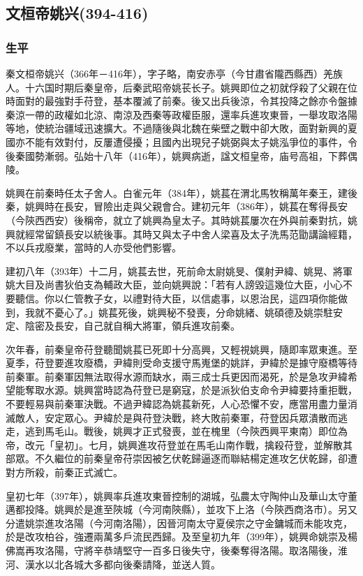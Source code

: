 
\subsection{文桓帝姚兴\tiny(394-416)}

\subsubsection{生平}

秦文桓帝姚兴（366年－416年），字子略，南安赤亭（今甘肅省隴西縣西）羌族人。十六国时期后秦皇帝，后秦武昭帝姚苌长子。姚興即位之初就俘殺了父親在位時面對的最強對手苻登，基本覆滅了前秦。後又出兵後涼，令其投降之餘亦令盤據秦涼一帶的政權如北涼、南涼及西秦等政權臣服，還率兵進攻東晉，一舉攻取洛陽等地，使統治疆域迅速擴大。不過隨後與北魏在柴壁之戰中卻大敗，面對新興的夏國亦不能有效對付，反屢遭侵擾；且國內出現兒子姚弼與太子姚泓爭位的事件，令後秦國勢漸弱。弘始十八年（416年），姚興病逝，諡文桓皇帝，庙号高祖，下葬偶陵。

姚興在前秦時任太子舍人。白雀元年（384年），姚萇在渭北馬牧稱萬年秦王，建後秦，姚興時在長安，冒險出走與父親會合。建初元年（386年），姚萇在奪得長安（今陝西西安）後稱帝，就立了姚興為皇太子。其時姚萇屢次在外與前秦對抗，姚興就經常留鎮長安以統後事。其時又與太子中舍人梁喜及太子洗馬范勖講論經籍，不以兵戎廢業，當時的人亦受他們影響。

建初八年（393年）十二月，姚萇去世，死前命太尉姚旻、僕射尹緯、姚晃、將軍姚大目及尚書狄伯支為輔政大臣，並向姚興說：「若有人謗毀這幾位大臣，小心不要聽信。你以仁管教子女，以禮對待大臣，以信處事，以恩治民，這四項你能做到，我就不憂心了。」姚萇死後，姚興秘不發喪，分命姚緒、姚碩德及姚崇駐安定、陰密及長安，自己就自稱大將軍，領兵進攻前秦。

次年春，前秦皇帝苻登聽聞姚萇已死即十分高興，又輕視姚興，隨即率眾東進。至夏季，苻登要進攻廢橋，尹緯則受命支援守馬嵬堡的姚詳，尹緯於是據守廢橋等待前秦軍。前秦軍因無法取得水源而缺水，兩三成士兵更因而渴死，於是急攻尹緯希望能奪取水源。姚興當時認為苻登已是窮寇，於是派狄伯支命令尹緯要持重拒戰，不要輕易與前秦軍決戰。不過尹緯認為姚萇新死，人心恐懼不安，應當用盡力量消滅敵人，安定眾心。尹緯於是與苻登決戰，終大敗前秦軍，苻登因兵眾潰散而逃走，逃到馬毛山。戰後，姚興才正式發喪，並在槐里（今陝西興平東南）即位為帝，改元「皇初」。七月，姚興進攻苻登並在馬毛山南作戰，擒殺苻登，並解散其部眾。不久繼位的前秦皇帝苻崇因被乞伏乾歸逼逐而聯結楊定進攻乞伏乾歸，卻遭對方所殺，前秦正式滅亡。

皇初七年（397年），姚興率兵進攻東晉控制的湖城，弘農太守陶仲山及華山太守董邁都投降。姚興於是進至陝城（今河南陝縣），並攻下上洛（今陝西商洛市）。另又分遣姚崇進攻洛陽（今河南洛陽），因晉河南太守夏侯宗之守金鏞城而未能攻克，於是改攻柏谷，強遷兩萬多戶流民西歸。及至皇初九年（399年），姚興命姚崇及楊佛嵩再攻洛陽，守將辛恭靖堅守一百多日後失守，後秦奪得洛陽。取洛陽後，淮河、漢水以北各城大多都向後秦請降，並送人質。

